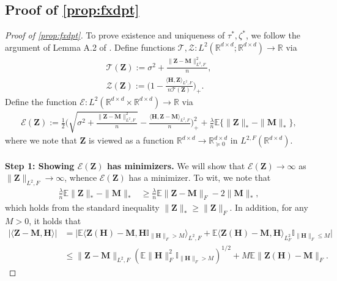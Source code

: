 \documentclass[10pt]{article}
\newcommand{\s}{^*}
\theoremstyle{definition}
\begin{document}
\subsection{Proof of \cref{prop:fxdpt}} \label{sec:fixedpointproof}
\begin{proof}[Proof of \cref{prop:fxdpt}]
To prove existence and uniqueness of $\tau\s,\zeta\s$, we follow the argument of Lemma A.2 of \citet{celentano_lasso_2023}.  Define functions $\mathcal{T}, \mathcal{Z} : L^2( \mathbb{R}^{d\times d} ; \mathbb{R}^{d \times d} ) \to \mathbb{R}$ via
\begin{align}
    \mathcal{T}(\bm{Z}) := \sigma^2 + \frac{\| \bm{Z} - \bm{M} \|_{L^2,F}^2}{n}, \\
    \mathcal{Z}(\bm{Z}) :=  \bigg( 1 - \frac{\langle \bm{H}, \bm{Z} \rangle_{L^2,F} }{n \mathcal{T}(\bm{Z})} \bigg)_+.
\end{align}
Define the function $\mathcal{E} : L^2(  \mathbb{R}^{d\times d} \times \mathbb{R}^{d \times d} ) \to \mathbb{R}$ via 
\begin{align}
\mathcal{E}(\bm{Z}) := \frac{1}{2} \bigg( \sqrt{\sigma^2 + \frac{\|\bm{Z - M}\|_{L^2,F}^2}{n}} - \frac{\langle \bm{H}, \bm{Z - M} \rangle_{L^2,F}}{n} \bigg)^2_+ + \frac{\lambda}{n} \mathbb{E} \big\{ \| \bm{Z}  \|_* - \| \bm{M} \|_* \big\},
\end{align}
where we note that $\bm{Z}$ is viewed as a function  $\mathbb{R}^{d\times d} \to \mathbb{R}^{d\times d}_{\succcurlyeq 0}$ in $L^{2,F}(\mathbb{R}^{d\times d})$.  
\\ \ \\
\noindent
\textbf{Step 1: Showing $\mathcal{E}(\bm{Z})$ has minimizers.} 
 We will show that $\mathcal{E}(\bm{Z}) \to \infty$ as $\| \bm{Z} \|_{L^2,F} \to \infty$, whence $\mathcal{E}(\bm{Z})$ has a minimizer.  
To wit, we note that
\begin{align}
\frac{\lambda}{n} \mathbb{E} \| \bm{Z} \|_* - \| \bm{M} \|_* &\geq \frac{\lambda}{n} \mathbb{E} \| \bm{Z} - \bm{M} \|_F - 2\| \bm{M} \|_*,
\end{align}
which holds from the standard inequality $\| \bm{Z} \|_* \geq \| \bm{Z} \|_F$.  In addition, for any $M > 0$, it holds that
\begin{align}
     | \langle \bm{Z} - \bm{M}, \bm{H} \rangle | &= \big| \mathbb{E} \langle \bm{Z}(\bm{H}) - \bm{M}, \bm{H} \mathbb{I}_{\| \bm{H} \|_F > M } \rangle_{L^2,F} + \mathbb{E} \langle \bm{Z}(\bm{H}) - \bm{M}, \bm{H} \rangle_{L^2_F} \mathbb{I}_{\| \bm{H} \|_F \leq M} \big| \\
     &\leq \| \bm{Z}- \bm{M} \|_{L^2,F} (\mathbb{E} \| \bm{H} \|_F^2 \mathbb{I}_{\| \bm{H} \|_F > M} )^{1/2} + M \mathbb{E} \| \bm{Z}(\bm{H}) - \bm{M} \|_F.

\end{align}
\end{proof}
\end{document}
